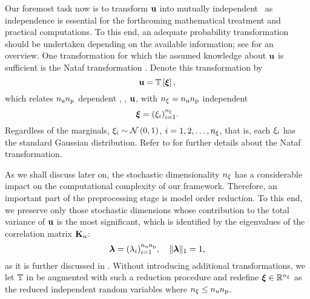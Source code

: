 Our foremost task now is to transform $\mathbf{u}$ into mutually independent \rvs\ as independence is essential for the forthcoming mathematical treatment and practical computations.
To this end, an adequate probability transformation should be undertaken depending on the available information; see \cite{eldred2008} for an overview.
One transformation for which the assumed knowledge about $\mathbf{u}$ is sufficient is the Nataf transformation \cite{li2008}.
Denote this transformation by
\begin{equation} \elab{probability-transformation}
  \vu = \transformation{\vz},
\end{equation}
which relates ${n_\text{u}} {n_\text{p}}$ dependent \rvs, \ie, $\mathbf{u}$, with ${n_\xi} = {n_\text{u}} {n_\text{p}}$ independent \rvs
\begin{equation} \elab{independent-random-variables}
  \vz = (\z_i)_{i = 1}^\nvars.
\end{equation}
Regardless of the marginals, $\xi_i \sim \mathcal{N}\left( 0, 1 \right)$, $i = 1, 2, \dots, {n_\xi}$, that is, each $\xi_i$ has the standard Gaussian distribution.
Refer to  for further details about the Nataf transformation.

As we shall discuss later on, the stochastic dimensionality ${n_\xi}$ has a considerable impact on the computational complexity of our framework.
Therefore, an important part of the preprocessing stage is model order reduction.
To this end, we preserve only those stochastic dimensions whose contribution to the total variance of $\mathbf{u}$ is the most significant, which is identified by the eigenvalues of the correlation matrix $\mathbf{K}_u$:
\begin{equation} \elab{dimension-contribution}
  \dimensionContribution = (\lambda_i)_{i = 1}^{\nparams \nprocs}, \hspace{1em} \norm[1]{\dimensionContribution} = 1,
\end{equation}
as it is further discussed in .
Without introducing additional transformations, we let $\transformation$ in  be augmented with such a reduction procedure and redefine $\bm{\xi} \in \mathbb{R}^{n_\xi}$ as the reduced independent random variables where ${n_\xi} \leq {n_\text{u}} {n_\text{p}}$.

